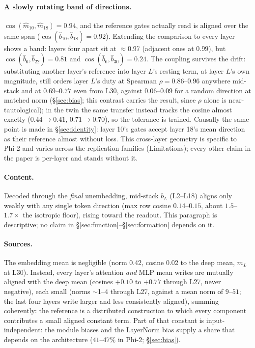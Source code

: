 \documentclass[11pt]{article}
\newcommand{\bl}{b_L}
\newcommand{\mhat}{\hat{m}}
\begin{document}
\paragraph{A slowly rotating band of directions.}
$\cos(\mhat_{10}, \mhat_{18}) = 0.94$, and the reference gates
actually read is aligned over the same span
($\cos(\hat{b}_{10}, \hat{b}_{18}) = 0.92$). Extending the
comparison to every layer shows a band:
layers four apart sit at $\approx 0.97$ (adjacent ones at $0.99$), but
$\cos(\hat{b}_{6}, \hat{b}_{22}) = 0.81$ and
$\cos(\hat{b}_{6}, \hat{b}_{30}) = 0.24$. The coupling survives
the drift: substituting another layer's reference into layer $L$'s resting term, at layer
$L$'s own magnitude, still orders layer $L$'s duty at Spearman
$\rho = 0.86$--$0.96$ anywhere mid-stack and at $0.69$--$0.77$ even
from L30, against $0.06$--$0.09$ for a random direction at matched norm
(\S\ref{sec:bias}; this contrast carries the result, since $\rho$ alone
is near-tautological); in the twin the same transfer instead tracks the
cosine almost exactly ($0.44 \to 0.41$, $0.71 \to 0.70$), so the
tolerance is trained. Causally the same point is made in
\S\ref{sec:identity}: layer 10's gates accept layer 18's mean
direction as their reference almost without loss. This cross-layer
geometry is specific to Phi-2 and varies across the replication
families (Limitations); every
other claim in the paper is per-layer and stands without it.

\paragraph{Content.} Decoded through the \emph{final} unembedding,
mid-stack $\bl$ (L2--L18) aligns only weakly with any single token
direction (max row cosine $0.14$--$0.15$, about $1.5$--$1.7\times$ the isotropic floor), rising toward the readout. This paragraph is
descriptive; no claim in \S\ref{sec:function}--\S\ref{sec:formation}
depends on it.

\paragraph{Sources.} The embedding mean is negligible (norm 0.42,
cosine 0.02 to the deep mean, $m_L$ at L30). Instead, every layer's attention
\emph{and} MLP mean writes are mutually aligned with the deep mean
(cosines $+0.10$ to $+0.77$ through L27, never negative), each small
(norms $\sim$1--4 through L27, against a mean norm of $9$--$51$; the last
four layers write larger and less consistently aligned), summing
coherently: the reference is a distributed construction to which every
component contributes a small aligned constant term. Part of that
constant is input-independent: the module biases and the LayerNorm bias
supply a share that depends on the architecture ($41$--$47\%$ in Phi-2;
\S\ref{sec:bias}).
\end{document}
